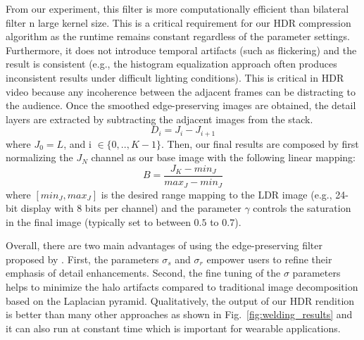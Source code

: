 
From our experiment, this filter is more computationally efficient than bilateral filter n large kernel 
size. This is a critical requirement for our HDR compression algorithm as the runtime remains 
constant regardless of the parameter settings. Furthermore, it does not introduce temporal artifacts 
(such as flickering) and the result is consistent (e.g., the histogram equalization approach often 
produces inconsistent results under difficult lighting conditions). This is critical in HDR video because 
any incoherence between the adjacent frames can be distracting to the audience.
Once the smoothed edge-preserving images are obtained, the detail layers are extracted by 
subtracting the adjacent images from the stack.
\begin{equation}
D_i = J_i - J_{i+1}
\end{equation} where $J_0=L$, and i $\in \{0,..,K-1\}$.
Then, our final results are composed by first normalizing the $J_N$ channel as our base image with 
the following linear mapping:
\begin{equation}
B = \frac{J_K - min_J}{max_J - min_J}
\end{equation}
where $[min_J, max_J]$ is the desired range mapping to the LDR image (e.g., 24-bit display with 8 
bits per channel) and
 the parameter $\gamma$ controls the saturation in the final image (typically set to between $0.5$ to 
$0.7$). 


Overall, there are two main advantages of using the edge-preserving filter proposed by 
\cite{GastalOliveira2011DomainTransform}. First, the parameters $\sigma_s$ and $\sigma_r$ 
empower users to refine their emphasis of detail enhancements. Second, the fine tuning of the $
\sigma$ parameters helps to minimize the halo artifacts compared to traditional image decomposition 
based on the Laplacian pyramid. Qualitatively, the output of our HDR rendition is better than many 
other approaches as shown in Fig.~\ref{fig:welding_results} and it can also run at constant time which 
is important for wearable applications.


